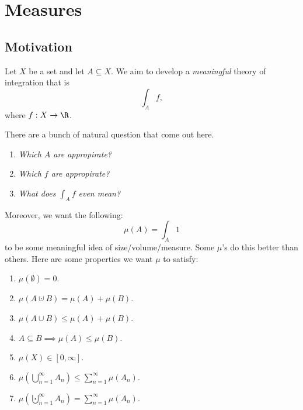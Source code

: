 \documentclass[pmath451]{subfiles}
\begin{document}
    \section{Measures}
    
    \subsection{Motivation}

    Let $X$ be a set and let $A\subseteq X$. We aim to develop a \textit{meaningful} theory of integration that is
    \begin{equation*}
        \int^{}_{A}f,
    \end{equation*}
    where $f:X\to\R$.

    There are a bunch of natural question that come out here.
    \begin{enumerate}
        \item \textit{Which $A$ are appropirate?}
        \item \textit{Which $f$ are appropirate?}
        \item \textit{What does $\int^{}_{A}f$ even mean?}
    \end{enumerate}

    \np Moreover, we want the following:
    \begin{equation*}
        \mu\left( A \right) = \int^{}_{A} 1
    \end{equation*}
    to be some meaningful idea of size/volume/measure. Some $\mu$'s do this better than others. Here are some properties we want $\mu$ to satisfy:
    \begin{enumerate}
        \item $\mu\left( \emptyset \right) = 0$.
        \item $\mu\left( A\cupdot B \right) = \mu\left( A \right) + \mu\left( B \right)$.
        \item $\mu\left( A\cup B \right) \leq \mu\left( A \right) + \mu\left( B \right)$.
        \item $A\subseteq B\implies \mu\left( A \right)\leq\mu\left( B \right)$.
        \item $\mu\left( X \right)\in\left[ 0,\infty \right]$.
        \item $\mu\left( \bigcup^{\infty}_{n=1} A_n \right) \leq \sum^{\infty}_{n=1} \mu\left( A_n \right)$.
        \item $\mu\left( \bigcupdot^{\infty}_{n=1} A_n \right) = \sum^{\infty}_{n=1} \mu\left( A_n \right)$.
    \end{enumerate}
    
\end{document}
